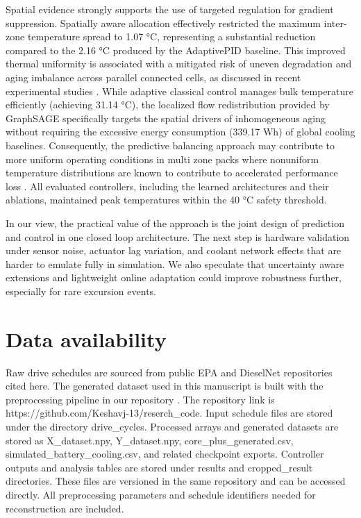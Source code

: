 \documentclass[twocolumn]{article}
\begin{document}
Spatial evidence strongly supports the use of targeted regulation for gradient suppression. Spatially aware allocation effectively restricted the maximum inter-zone temperature spread to 1.07 °C, representing a substantial reduction compared to the 2.16 °C produced by the AdaptivePID baseline. This improved thermal uniformity is associated with a mitigated risk of uneven degradation and aging imbalance across parallel connected cells, as discussed in recent experimental studies \cite{Iriyama2024}. While adaptive classical control manages bulk temperature efficiently (achieving 31.14 °C), the localized flow redistribution provided by GraphSAGE specifically targets the spatial drivers of inhomogeneous aging without requiring the excessive energy consumption (339.17 Wh) of global cooling baselines. Consequently, the predictive balancing approach may contribute to more uniform operating conditions in multi zone packs where nonuniform temperature distributions are known to contribute to accelerated performance loss \cite{Li2023}. All evaluated controllers, including the learned architectures and their ablations, maintained peak temperatures within the 40 °C safety threshold.

In our view, the practical value of the approach is the joint design of prediction and control in one closed loop architecture. The next step is hardware validation under sensor noise, actuator lag variation, and coolant network effects that are harder to emulate fully in simulation. We also speculate that uncertainty aware extensions and lightweight online adaptation could improve robustness further, especially for rare excursion events.

\section*{Data availability}
Raw drive schedules are sourced from public EPA and DieselNet repositories cited here. The generated dataset used in this manuscript is built with the preprocessing pipeline in our repository \cite{KeshavRepo2026}. The repository link is https://github.com/Keshavj-13/reserch_code. Input schedule files are stored under the directory drive_cycles. Processed arrays and generated datasets are stored as X_dataset.npy, Y_dataset.npy, core_plus_generated.csv, simulated_battery_cooling.csv, and related checkpoint exports. Controller outputs and analysis tables are stored under results and cropped_result directories. These files are versioned in the same repository and can be accessed directly. All preprocessing parameters and schedule identifiers needed for reconstruction are included.
\end{document}
